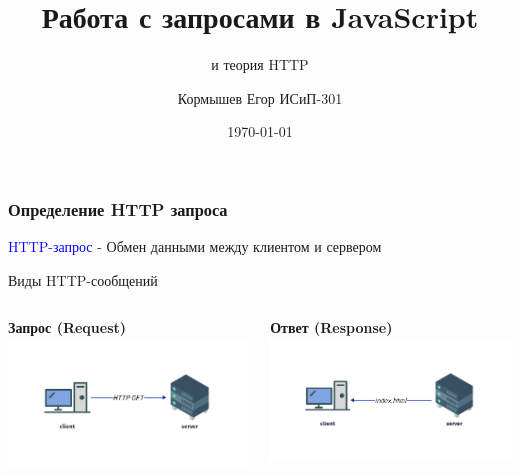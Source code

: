 \documentclass[aspectratio=169]{beamer}
\title{Работа с запросами в JavaScript}
\subtitle{и теория HTTP}
\author{Кормышев Егор ИСиП-301}
\date{\today}
\begin{document}
\frame{\titlepage}


\begin{frame}
  \frametitle{Определение HTTP запроса}
  
  \bigskip
  
  \large\textcolor{blue}{HTTP-запрос} - \normalsize Обмен данными между клиентом и сервером
  
  \bigskip

  \begin{center}
    \large Виды HTTP-сообщений
  \end{center}

  \begin{columns}
    
    \begin{column}{0.5\textwidth}
      \centering
      \large \textbf{Запрос (Request)}
      \includegraphics[width=1.2\textwidth]{assets/request.png}
    \end{column}
    
    
    \begin{column}{0.5\textwidth}
      \centering
      \large \textbf{Ответ (Response)}
      \includegraphics[width=1.2\textwidth]{assets/response.png}
    \end{column}

  \end{columns}


\end{frame}
\end{document}
